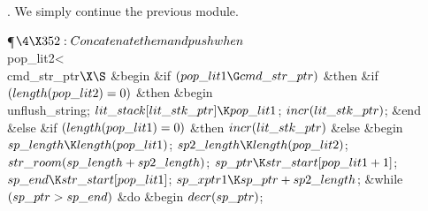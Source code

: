 .
We simply continue the previous module.

\Y\P$\4\X352:Concatenate them and push when $\\{pop\_lit2}<\\{cmd\_str\_ptr}$\X%
\S$\6
\&{begin} \&{if} $(\\{pop\_lit1}\G\\{cmd\_str\_ptr})$ \1\&{then}\6
\&{if} $(\\{length}(\\{pop\_lit2})=0)$ \1\&{then}\6
\&{begin} \\{unflush\_string};\5
$\\{lit\_stack}[\\{lit\_stk\_ptr}]\K\\{pop\_lit1}$;\5
$\\{incr}(\\{lit\_stk\_ptr})$;\6
\&{end}\6
\4\&{else} \&{if} $(\\{length}(\\{pop\_lit1})=0)$ \1\&{then}\5
$\\{incr}(\\{lit\_stk\_ptr})$\6
\4\&{else} \2\2\2\6
\&{begin} $\\{sp\_length}\K\\{length}(\\{pop\_lit1})$;\5
$\\{sp2\_length}\K\\{length}(\\{pop\_lit2})$;\5
$\\{str\_room}(\\{sp\_length}+\\{sp2\_length})$;\5
$\\{sp\_ptr}\K\\{str\_start}[\\{pop\_lit1}+1]$;\5
$\\{sp\_end}\K\\{str\_start}[\\{pop\_lit1}]$;\5
$\\{sp\_xptr1}\K\\{sp\_ptr}+\\{sp2\_length}$;\6
\&{while} $(\\{sp\_ptr}>\\{sp\_end})$ \1\&{do}\6
\&{begin} $\\{decr}(\\{sp\_ptr})$;\5
